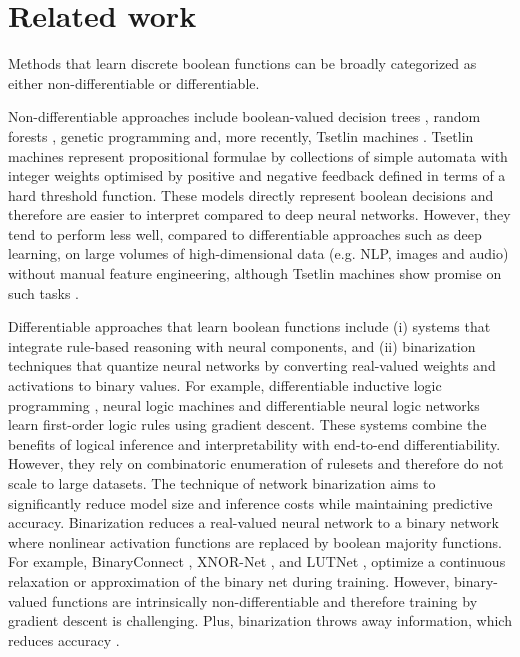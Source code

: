 \documentclass{article} %
\begin{document}
\section{Related work}\label{sec:related-work}

Methods that learn discrete boolean functions can be broadly categorized as either non-differentiable or differentiable.

Non-differentiable approaches include boolean-valued decision trees \citep{BreiFrieStonOlsh84}, random forests \citep{598994}, genetic programming \citep{koza1992genetic} and, more recently, Tsetlin machines \cite{granmo18}. Tsetlin machines represent propositional formulae by collections of simple automata with integer weights optimised by positive and negative feedback defined in terms of a hard threshold function. These models directly represent boolean decisions and therefore are easier to interpret compared to deep neural networks. However, they tend to perform less well, compared to differentiable approaches such as deep learning, on large volumes of high-dimensional data (e.g. NLP, images and audio) without manual feature engineering, although Tsetlin machines show promise on such tasks \citep{Granmo2019TheCT}.

Differentiable approaches that learn boolean functions include (i) systems that integrate rule-based reasoning with neural components, and (ii) binarization techniques that quantize neural networks by converting real-valued weights and activations to binary values. For example, differentiable inductive logic programming \citep{10.5555/3241691.3241692}, neural logic machines \citep{dong2018neural} 
and differentiable neural logic networks \cite{DBLP:phd/basesearch/Payani20} learn first-order logic rules using gradient descent. These systems combine the benefits of logical inference and interpretability with end-to-end differentiability. However, they rely on combinatoric enumeration of rulesets and therefore do not scale to large datasets. The technique of network binarization aims to significantly reduce model size and inference costs while maintaining predictive accuracy. Binarization reduces a real-valued neural network to a binary network where nonlinear activation functions are replaced by boolean majority functions. For example, BinaryConnect \citep{10.5555/2969442.2969588}, XNOR-Net \citep{10.1007/978-3-319-46493-0_32}, and LUTNet \citep{9026948}, optimize a continuous relaxation or approximation of the binary net during training. However, binary-valued functions are intrinsically non-differentiable and therefore training by gradient descent is challenging. Plus, binarization throws away information, which reduces accuracy \citep{QIN2020107281}. 
\end{document}
